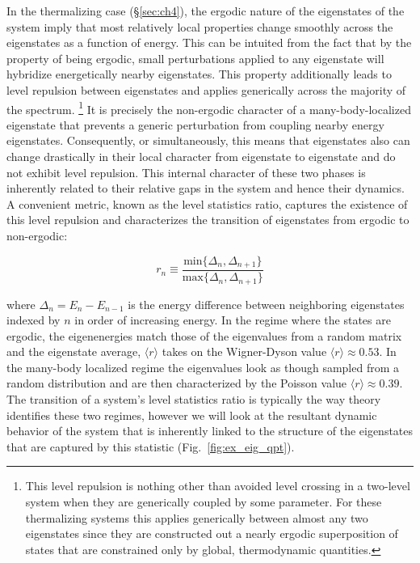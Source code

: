 In the thermalizing case (\S \ref{sec:ch4}), the ergodic nature of the eigenstates of the system imply that most relatively local properties change smoothly across the eigenstates as a function of energy. This can be intuited from the fact that by the property of being ergodic, small perturbations applied to any eigenstate will hybridize energetically nearby eigenstates. This property additionally leads to level repulsion between eigenstates and applies generically across the majority of the spectrum\cite{DAlessio2016}. \footnote{This level repulsion is nothing other than avoided level crossing in a two-level system when they are generically coupled by some parameter. For these thermalizing systems this applies generically between almost any two eigenstates since they are constructed out a nearly ergodic superposition of states that are constrained only by global, thermodynamic quantities.} It is precisely the non-ergodic character of a many-body-localized eigenstate that prevents a generic perturbation from coupling nearby energy eigenstates. Consequently, or simultaneously, this means that eigenstates also can change drastically in their local character from eigenstate to eigenstate and do not exhibit level repulsion. This internal character of these two phases is inherently related to their relative gaps in the system and hence their dynamics\cite{Huse2013}. A convenient metric, known as the level statistics ratio, captures the existence of this level repulsion and characterizes the transition of eigenstates from ergodic to non-ergodic:

\begin{equation}
\label{eqn:levelStat}
r_n \equiv \frac{\text{min}\{\Delta_n,\Delta_{n+1}\}}{\text{max}\{\Delta_n,\Delta_{n+1}\}}
\end{equation}

where $\Delta_n = E_n - E_{n-1}$ is the energy difference between neighboring eigenstates indexed  by $n$ in order of increasing energy. In the regime where the states are ergodic, the eigenenergies match those of the eigenvalues from a random matrix and the eigenstate average, $\langle r \rangle$ takes on the Wigner-Dyson value $\langle r \rangle \approx 0.53$. In the many-body localized regime the eigenvalues look as though sampled from a random distribution and are then characterized by the Poisson value $\langle r \rangle \approx 0.39$. The transition of a system's level statistics ratio is typically the way theory identifies these two regimes, however we will look at the resultant dynamic behavior of the system that is inherently linked to the structure of the eigenstates that are captured by this statistic (Fig.~\ref{fig:ex_eig_qpt}). 

